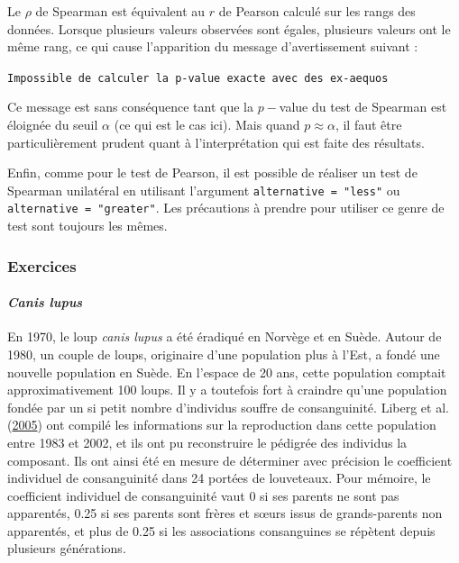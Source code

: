 \documentclass[
  a4paper,
]{article}
\begin{document}
Le \(\rho\) de Spearman est équivalent au \(r\) de Pearson calculé sur les rangs des données. Lorsque plusieurs valeurs observées sont égales, plusieurs valeurs ont le même rang, ce qui cause l'apparition du message d'avertissement suivant :

\texttt{Impossible\ de\ calculer\ la\ p-value\ exacte\ avec\ des\ ex-aequos}

Ce message est sans conséquence tant que la \(p-\)value du test de Spearman est éloignée du seuil \(\alpha\) (ce qui est le cas ici). Mais quand \(p \approx \alpha\), il faut être particulièrement prudent quant à l'interprétation qui est faite des résultats.

Enfin, comme pour le test de Pearson, il est possible de réaliser un test de Spearman unilatéral en utilisant l'argument \texttt{alternative\ =\ "less"} ou \texttt{alternative\ =\ "greater"}. Les précautions à prendre pour utiliser ce genre de test sont toujours les mêmes.

\hypertarget{exercices}{%
\subsubsection{Exercices}\label{exercices}}

\hypertarget{canis-lupus}{%
\paragraph{\texorpdfstring{\emph{Canis lupus}}{Canis lupus}}\label{canis-lupus}}

En 1970, le loup \emph{canis lupus} a été éradiqué en Norvège et en Suède. Autour de 1980, un couple de loups, originaire d'une population plus à l'Est, a fondé une nouvelle population en Suède. En l'espace de 20 ans, cette population comptait approximativement 100 loups. Il y a toutefois fort à craindre qu'une population fondée par un si petit nombre d'individus souffre de consanguinité. Liberg et al. (\protect\hyperlink{ref-liberg2005}{2005}) ont compilé les informations sur la reproduction dans cette population entre 1983 et 2002, et ils ont pu reconstruire le pédigrée des individus la composant. Ils ont ainsi été en mesure de déterminer avec précision le coefficient individuel de consanguinité dans 24 portées de louveteaux.
Pour mémoire, le coefficient individuel de consanguinité vaut 0 si ses parents ne sont pas apparentés, 0.25 si ses parents sont frères et sœurs issus de grands-parents non apparentés, et plus de 0.25 si les associations consanguines se répètent depuis plusieurs générations.
\end{document}
